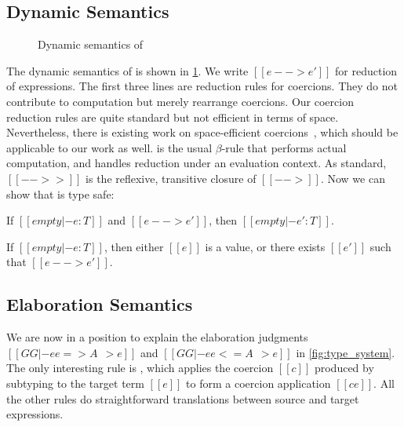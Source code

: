 \subsection{Dynamic Semantics}

\begin{figure}[t]
  \centering
{}
  \caption{Dynamic semantics of \tname}
  \label{fig:coercion_red}
\end{figure}

The dynamic semantics of \tname is shown in \cref{fig:coercion_red}. We write
$[[e --> e']]$ for reduction of expressions. The first three lines are reduction
rules for coercions. They do not contribute to computation but merely rearrange
coercions. Our coercion reduction rules are quite standard but not efficient in
terms of space. Nevertheless, there is existing work on space-efficient
coercions~\citep{Siek_2015, herman2010space}, which should be applicable to our
work as well.  is the usual $\beta$-rule that performs actual
computation, and  handles reduction under an evaluation context. As
standard, $[[-->>]]$ is the reflexive, transitive closure of $[[-->]]$.
Now we can show that \tname is type safe:

\begin{theorem}[Preservation] \label{thm:target_preserve}
  If $[[empty |- e : T]]$ and $[[e --> e']]$, then $[[empty |- e' : T]]$.
\end{theorem}

\begin{theorem}[Progress] \label{thm:target_progress}
  If $[[empty |- e : T]]$, then either $[[e]]$ is a value, or there exists $[[e']]$ such
  that $[[e --> e']]$.
\end{theorem}


\subsection{Elaboration Semantics}


We are now in a position to explain the elaboration judgments $[[GG |- ee => A ~~> e]]$
and $[[GG |- ee <= A ~~> e]]$ in \cref{fig:type_system}. The only
interesting rule is , which applies the coercion $[[c]]$ produced by
subtyping to the target term $[[e]]$ to form a coercion application
$[[c e]]$. All the other rules do straightforward translations between
source and target expressions.


